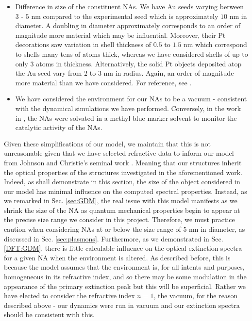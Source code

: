 \begin{itemize}
    \item Difference in size of the constituent NAs. We have Au seeds varying between $3$ - $5$ nm compared to the experimental seed which is approximately $10$ nm in diameter. A doubling in diameter approximately corresponds to an order of magnitude more material which may be influential. Moreover, their Pt decorations saw variation in shell thickness of $0.5$ to $1.5$ nm which correspond to shells many tens of atoms thick, whereas we have considered shells of up to only $3$ atoms in thickness. Alternatively, the solid Pt objects deposited atop the Au seed vary from $2$ to $3$ nm in radius. Again, an order of magnitude more material than we have considered. For reference, see \cite{JorgeStructure}.

    \item We have considered the environment for our NAs to be a vacuum - consistent with the dynamical simulations we have performed. Conversely, in the work in \cite{JorgeStructure}, the NAs were solvated in a methyl blue marker solvent to monitor the catalytic activity of the NAs.
\end{itemize}

Given these simplifications of our model, we maintain that this is not unreasonable given that we have selected refractive data to inform our model from Johnson and Christie's seminal work \cite{PhysRevB.6.4370}. Meaning that our structures inherit the optical properties of the structures investigated in the aforementioned work. Indeed, as shall demonstrate in this section, the size of the object considered in our model has minimal influence on the computed spectral properties. Instead, as we remarked in Sec. \ref{sec:GDM}, the real issue with this model manifests as we shrink the size of the NA as quantum mechanical properties begin to appear at the precise size range we consider in this project. Therefore, we must practice caution when considering NAs at or below the size range of $5$ nm in diameter, as discussed in Sec. \ref{sec:plasmons}. Furthermore, as we demonstrated in Sec. \ref{DFT:GDM}, there is little calculable influence on the optical extinction spectra for a given NA when the environment is altered. As described before, this is because the model assumes that the environment is, for all intents and purposes, homogeneous in its refractive index, and so there may be some modulation in the appearance of the primary extinction peak but this will be superficial. Rather we have elected to consider the refractive index $n = 1$, the vacuum, for the reason described above - our dynamics were run in vacuum and our extinction spectra should be consistent with this.


